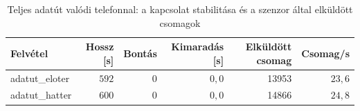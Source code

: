 \begin{table}[htbp]
  \centering
  \small
  \begin{tabular}{@{}lrrrrr@{}}
    \toprule
    Felvétel & Hossz [s] & Bontás & Kimaradás [s] & Elküldött csomag & Csomag/s \\
    \midrule
    adatut\_eloter & $592$ & 0 & $0{,}0$ & 13953 & $23{,}6$ \\
    adatut\_hatter & $600$ & 0 & $0{,}0$ & 14866 & $24{,}8$ \\
    \bottomrule
  \end{tabular}
  \caption{Teljes adatút valódi telefonnal: a kapcsolat stabilitása és a szenzor által elküldött csomagok}
  \label{tab:adatut}
\end{table}
